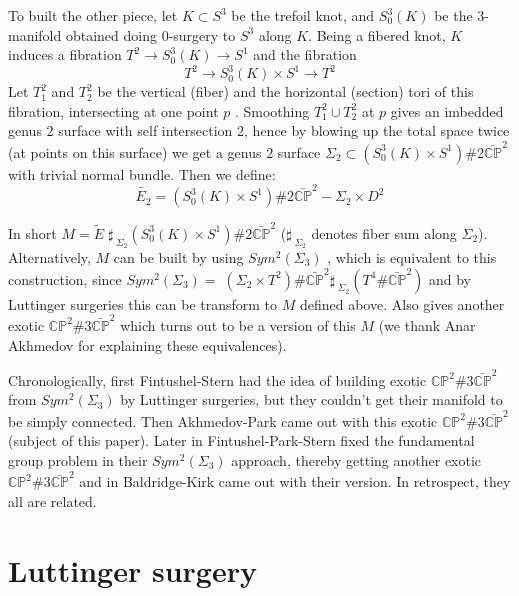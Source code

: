 \documentclass[11pt]{amsart}
\begin{document}
To built the other piece, let $K\subset S^3$ be the trefoil knot, and $S^{3}_{0}(K)$ be the $3$-manifold obtained doing $0$-surgery to $S^3$ along $K$. Being a fibered knot, $K$ induces a fibration $T^2\to S^{3}_{0}(K)\to S^1$ and the fibration
$$T^2\to S^{3}_{0}(K)\times S^1\to T^2$$
Let $T^{2}_1$ and $T^{2}_2$ be the vertical (fiber) and the horizontal (section) tori of this fibration, intersecting at one point $p$ . Smoothing $T_{1}^{2}\cup T^{2}_{2}$ at $p$ gives an imbedded genus $2$ surface with self intersection $2$, hence by blowing up the total space twice (at points on this surface) we get a genus $2$ surface   $\Sigma_{2} \subset (S^{3}_{0}(K)\times S^1) \# 2\bar{{{\mathbb C}}{{\mathbb P}}}^2$ with trivial normal bundle. Then we define: $$\tilde{E_{2}}=(S^{3}_{0}(K)\times S^1) \# 2 \bar{{{\mathbb C}}{{\mathbb P}}}^2 - \Sigma_{2} \times D^2$$

\noindent In short  $M= \tilde{E}\;\sharp_{\;\Sigma_{2}} (S^{3}_{0}(K)\times S^1) \# 2 \bar{{{\mathbb C}}{{\mathbb P}}}^2 $ ($\sharp_{\;\Sigma_{2}}$ denotes fiber sum along $\Sigma_{2}$).  Alternatively, $M$ can be built by using   $Sym^{2} (\Sigma_{3})$ 
\cite{fps}, which is equivalent to this construction, since 
$Sym^{2} (\Sigma_{3})=
  \;(\Sigma_{2} \times T^{2}) \# \bar{{{\mathbb C}}{{\mathbb P}}}^2 \sharp_{\;\Sigma_{2}}  (T^4 \# \bar{{{\mathbb C}}{{\mathbb P}}}^2 )$  and by Luttinger surgeries this can be transform to $M$ defined above. Also \cite{bk} gives another  exotic ${{{\mathbb C}}{{\mathbb P}}}^{2}\#3\bar{{{\mathbb C}}{{\mathbb P}}}^2$ which turns out to be a version of this $M$ (we thank Anar Akhmedov for explaining these equivalences).  

{\Rm Chronologically, first  Fintushel-Stern had the idea of building exotic  ${{{\mathbb C}}{{\mathbb P}}}^{2}\#3\bar{{{\mathbb C}}{{\mathbb P}}}^2$ from $Sym^{2} (\Sigma_{3})$ by Luttinger surgeries, but they couldn't get their manifold to be simply connected. Then Akhmedov-Park came out with this exotic ${{{\mathbb C}}{{\mathbb P}}}^{2}\#3\bar{{{\mathbb C}}{{\mathbb P}}}^2$ \cite{ap} (subject of this paper). Later in \cite{fps} Fintushel-Park-Stern fixed the fundamental group problem in their  $Sym^{2} (\Sigma_{3})$ approach, thereby getting another exotic ${{{\mathbb C}}{{\mathbb P}}}^{2}\#3\bar{{{\mathbb C}}{{\mathbb P}}}^2$ and in \cite{bk}  Baldridge-Kirk came out with their version. In retrospect, they all are related.}

\section{Luttinger surgery}
\end{document}
